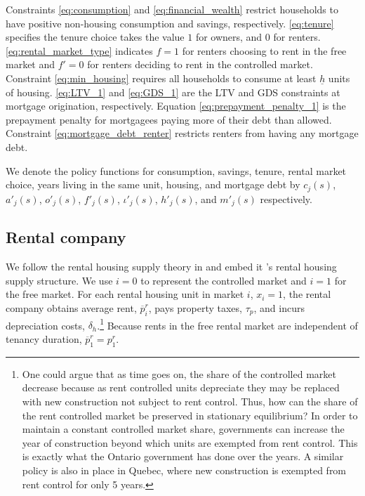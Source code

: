 \documentclass[parskip=full]{article}
\begin{document}
Constraints \ref{eq:consumption} and \ref{eq:financial_wealth} restrict households to have positive non-housing consumption and savings, respectively. \ref{eq:tenure} specifies the tenure choice takes the value $1$ for owners, and $0$ for renters. \ref{eq:rental_market_type} indicates $f=1$ for renters choosing to rent in the free market and $f'=0$ for renters deciding to rent in the controlled market. Constraint \ref{eq:min_housing} requires all households to consume at least $\underline{h}$ units of housing. \ref{eq:LTV_1} and \ref{eq:GDS_1} are the LTV and GDS constraints at mortgage origination, respectively. Equation \ref{eq:prepayment_penalty_1} is the prepayment penalty for mortgagees paying more of their debt than allowed. Constraint \ref{eq:mortgage_debt_renter} restricts renters from having any mortgage debt. 

We denote the policy functions for consumption, savings, tenure, rental market choice, years living in the same unit, housing, and mortgage debt by $c_{j}(s)$, $a'_{j}(s)$, $o'_{j}(s)$, $f'_{j}(s)$, $\iota'_{j}(s)$, $h'_{j}(s)$, and $m'_{j}(s)$ respectively.

\subsection{Rental company}\label{sec:rental_company}

We follow the rental housing supply theory in \citet{fallis-1985} and embed it \citet{garrigaeetal-2009}'s rental housing supply structure. We use $i=0$ to represent the controlled market and $i=1$ for the free market. For each rental housing unit in market $i$, $x_{i}=1$, the rental company obtains average rent, $\overline{p}^{r}_{i}$, pays property taxes, $\tau_{p}$, and incurs depreciation costs, $\delta_{h}$.\footnote{One could argue that as time goes on, the share of the controlled market decrease because as rent controlled units depreciate they may be replaced with new construction not subject to rent control. Thus, how can the share of the rent controlled market be preserved in stationary equilibrium? In order to maintain a constant controlled market share, governments can increase the year of construction beyond which units are exempted from rent control. This is exactly what the Ontario government has done over the years. A similar policy is also in place in Quebec, where new construction is exempted from rent control for only 5 years.} Because rents in the free rental market are independent of tenancy duration, $\overline{p}^{r}_{1}=p^{r}_{1}$. 
\end{document}
